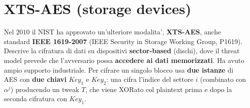 \section{XTS-AES (storage devices)}
Nel $ 2010 $ il NIST ha approvato un'ulteriore modalita', \textbf{XTS-AES}, anche standard \textbf{IEEE 1619-2007} (IEEE Security in Storage Working Group, P1619). Descrive la cifratura di dati su dispositivi \textbf{sector-based} (dischi), dove il threat model prevede che l'avversario possa \textbf{accedere ai dati memorizzati}. Ha avuto ampio supporto industriale. Per cifrare un singolo blocco usa \textbf{due istanze} di AES con \textbf{due chiavi} $ Key_1 $ e $ Key_2 $: una cifra l'indice del settore $ i $ (combinato con $ \alpha^j $) producendo un tweak $ T $, che viene XORato col plaintext prima e dopo la seconda cifratura con $ Key_1 $.

% 
